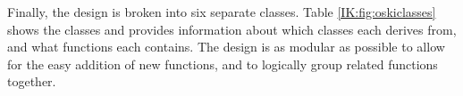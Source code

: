 Finally, the design is broken into six separate classes.
Table \ref{IK:fig:oskiclasses} shows the classes and provides information about which classes each
derives from, and what functions each contains.  The design is as modular as possible to allow
for the easy addition of new functions, and to logically group related functions together.




















